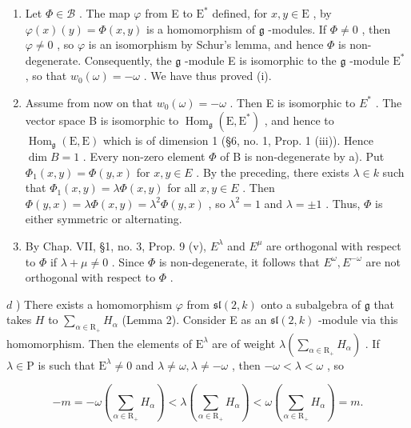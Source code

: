 \begin{enumerate}
\def\labelenumi{\alph{enumi})}
\item
  Let \(\Phi \in \mathcal{B}\) . The map \(\varphi\) from E to \(\mathrm{E}^*\) defined, for \(x, y \in \mathrm{E}\) , by \(\varphi(x)(y) = \Phi(x, y)\) is a homomorphism of \(\mathfrak{g}\) -modules. If \(\Phi \neq 0\) , then \(\varphi \neq 0\) , so \(\varphi\) is an isomorphism by Schur's lemma, and hence \(\Phi\) is non-degenerate. Consequently, the \(\mathfrak{g}\) -module E is isomorphic to the \(\mathfrak{g}\) -module \(\mathrm{E}^*\) , so that \(w_0(\omega) = -\omega\) . We have thus proved (i).
\item
  Assume from now on that \(w_{0}(\omega) = -\omega\) . Then E is isomorphic to \(E^{*}\) . The vector space B is isomorphic to \(\operatorname{Hom}_{\mathfrak{g}}(\mathrm{E}, \mathrm{E}^{*})\) , and hence to \(\operatorname{Hom}_{\mathfrak{g}}(\mathrm{E}, \mathrm{E})\) which is of dimension 1 (§6, no. 1, Prop. 1 (iii)). Hence \(\dim B = 1\) . Every non-zero element \(\Phi\) of B is non-degenerate by a). Put \(\Phi_{1}(x, y) = \Phi(y, x)\) for \(x, y \in E\) . By the preceding, there exists \(\lambda \in k\) such that \(\Phi_{1}(x, y) = \lambda \Phi(x, y)\) for all \(x, y \in E\) . Then \(\Phi(y, x) = \lambda \Phi(x, y) = \lambda^{2} \Phi(y, x)\) , so \(\lambda^{2} = 1\) and \(\lambda = \pm 1\) . Thus, \(\Phi\) is either symmetric or alternating.
\item
  By Chap. VII, §1, no. 3, Prop. 9 (v), \(E^{\lambda}\) and \(E^{\mu}\) are orthogonal with respect to \(\Phi\) if \(\lambda + \mu \neq 0\) . Since \(\Phi\) is non-degenerate, it follows that \(E^{\omega}, E^{-\omega}\) are not orthogonal with respect to \(\Phi\) .
\end{enumerate}

\(d\) ) There exists a homomorphism \(\varphi\) from \(\mathfrak{sl}(2,k)\) onto a subalgebra of \(\mathfrak{g}\) that takes \(H\) to \(\sum_{\alpha \in \mathrm{R}_{+}}H_{\alpha}\) (Lemma 2). Consider E as an \(\mathfrak{sl}(2,k)\) -module via this homomorphism. Then the elements of \(\mathrm{E}^{\lambda}\) are of weight \(\lambda \left(\sum_{\alpha \in \mathrm{R}_{+}}H_\alpha\right)\) . If \(\lambda \in \mathrm{P}\) is such that \(\mathrm{E}^{\lambda} \neq 0\) and \(\lambda \neq \omega, \lambda \neq -\omega\) , then \(-\omega < \lambda < \omega\) , so

\[
- m = - \omega \left(\sum_ {\alpha \in \mathrm{R} _ {+}} H _ {\alpha}\right) <   \lambda \left(\sum_ {\alpha \in \mathrm{R} _ {+}} H _ {\alpha}\right) <   \omega \left(\sum_ {\alpha \in \mathrm{R} _ {+}} H _ {\alpha}\right) = m.
\]

